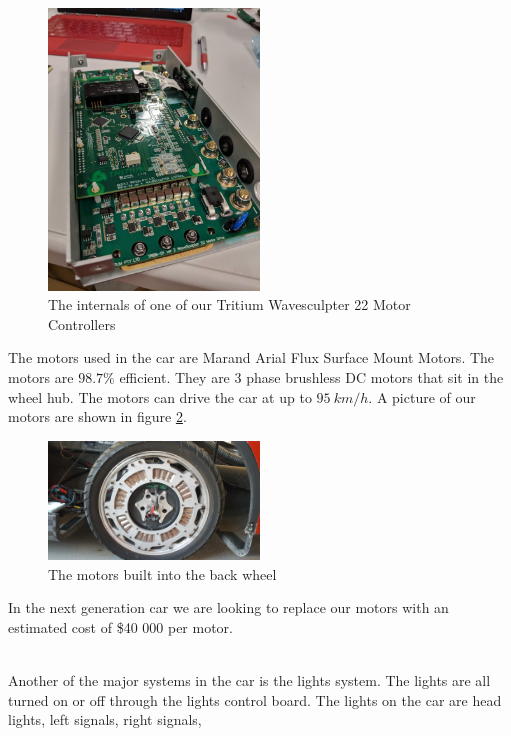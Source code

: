 \documentclass[titlepage]{article}
\begin{document}
    \begin{figure}[H]
        \centering
        \includegraphics[width=0.5\textwidth]{images/mc_inside.jpg}
        \caption{The internals of one of our Tritium Wavesculpter 22
            Motor Controllers}
        \label{fig:mc}
    \end{figure}
    The motors used in the car are Marand Arial Flux Surface Mount
    Motors. The motors are $98.7\%$ efficient. They are 3 phase
    brushless DC motors that sit in the wheel hub. The motors can drive
    the car at up to $95\ km/h$. A picture of our motors are shown in
    figure \ref{fig:motor}.
    \begin{figure}
        \centering
        \includegraphics[width=0.5\textwidth]{images/motor.jpg}
        \caption{The motors built into the back wheel}
        \label{fig:motor}
    \end{figure}
    \noindent In the next generation car we are looking to replace our
    motors with an estimated cost of \$40 000 per motor.\\\\
    \par Another of the major systems in the car is the lights system.
    The lights are all turned on or off through the lights control board.
    The lights on the car are head lights, left signals, right signals,
\end{document}
